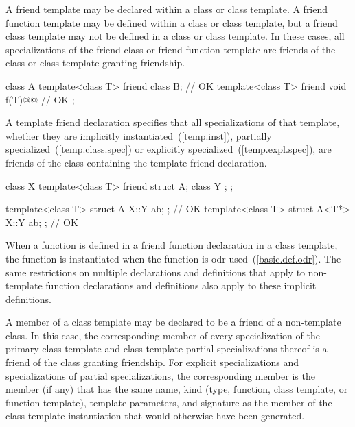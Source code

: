 \pnum
A friend template may be declared within a class or class template.
A friend function template may be defined within a class or class
template, but a friend class template may not be defined in a class
or class template.
In these cases, all specializations of the friend class or friend function
template are friends of the class or class template granting friendship.
\enterexample

\begin{codeblock}
class A {
  template<class T> friend class B;                 // OK
  template<class T> friend void f(T)@@  // OK
};
\end{codeblock}
\exitexample

\pnum
A template friend declaration specifies that all specializations of that
template, whether they are implicitly instantiated~(\ref{temp.inst}), partially
specialized~(\ref{temp.class.spec}) or explicitly specialized~(\ref{temp.expl.spec}),
are friends of the class containing the template friend declaration.
\enterexample

\begin{codeblock}
class X {
  template<class T> friend struct A;
  class Y { };
};

template<class T> struct A { X::Y ab; };            // OK
template<class T> struct A<T*> { X::Y ab; };        // OK
\end{codeblock}
\exitexample

\pnum
When a function is defined in a friend function declaration in a class
template, the function is instantiated when the function is
odr-used~(\ref{basic.def.odr}). The
same restrictions on multiple declarations and definitions that apply
to non-template function declarations and definitions also apply to
these implicit definitions.

\pnum
A member of a class template may be declared to be a friend of a
non-template class.
In this case,
the corresponding member of every specialization of
the primary class template and
class template partial specializations thereof
is a friend of the class granting friendship.
For
explicit specializations and
specializations of partial specializations,
the corresponding member is the member (if any)
that has the same name, kind (type, function, class template, or function
template), template parameters, and signature as the member of the class
template instantiation that would otherwise have been generated.
\enterexample

